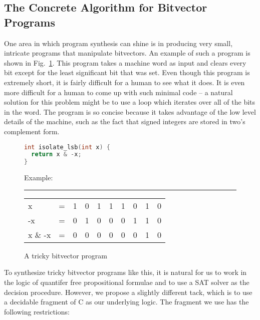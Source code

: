 \documentclass[a4paper]{llncs}
\begin{document}
\subsection{The Concrete Algorithm for Bitvector Programs}

One area in which program synthesis can shine is in producing very small,
intricate programs that manipulate bitvectors.  An example of such a program
is shown in Fig.~\ref{fig:bitvector-program}.  This program takes a machine word
as input and clears every bit except for the least significant bit that was set.
Even though this program is extremely short, it is fairly difficult for a human
to see what it does.  It is even more difficult for a human to come up with such
minimal code -- a natural solution for this problem might be to use a loop which
iterates over all of the bits in the word.  The program is so concise because it
takes advantage of the low level details of the machine, such as the fact that
signed integers are stored in two's complement form.

\begin{figure}
\centering
\begin{minipage}{0.45\linewidth}
 \begin{lstlisting}[language=C]
int isolate_lsb(int x) {
  return x & -x;
}
 \end{lstlisting}
\end{minipage}
\begin{minipage}{0.45\linewidth}
 
Example:

\hrule

\begin{tabular}{llcccccccc}
 x       & = & 1 & 0 & 1 & 1 & 1 & 0 & 1 & 0 \\
 -x      & = & 0 & 1 & 0 & 0 & 0 & 1 & 1 & 0 \\
 x \& -x & = & 0 & 0 & 0 & 0 & 0 & 0 & 1 & 0
\end{tabular}
\end{minipage}

 \label{fig:bitvector-program}
 \caption{A tricky bitvector program}
\end{figure}

To synthesize tricky bitvector programs like this, it is natural for us to work
in the logic of quantifer free propositional formulae and to use a SAT solver as
the decision procedure.  However, we propose a slightly different tack, which is
to use a decidable fragment of C as our underlying logic.  The fragment we use
has the following restrictions:
\end{document}
